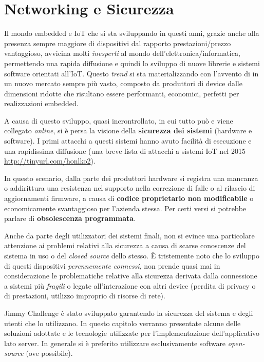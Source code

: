 \section{Networking e Sicurezza}

Il mondo embedded e IoT che si sta sviluppando in questi anni, grazie anche alla presenza sempre maggiore di dispositivi dal rapporto prestazioni/prezzo vantaggioso, avvicina molti \textit{inesperti} al mondo dell'elettronica/informatica, permettendo una rapida diffusione e quindi lo sviluppo di nuove librerie e sistemi software orientati all'IoT. Questo \textit{trend} si sta materializzando con l'avvento di in un nuovo mercato sempre più vasto, composto da produttori di device dalle dimensioni ridotte che risultano essere performanti, economici, perfetti per realizzazioni embedded.

A causa di questo sviluppo, quasi incrontrollato, in cui tutto può e viene  collegato \textit{online}, si è persa la visione della \textbf{sicurezza dei sistemi} (hardware e software). I primi attacchi a questi sistemi hanno avuto facilità di esecuzione e una rapidissima diffusione (una breve lista di attacchi a sistemi IoT nel 2015 \url{http://tinyurl.com/honlko2}).

In questo scenario, dalla parte dei produttori hardware si registra una mancanza o addirittura una resistenza nel supporto nella correzione di falle o al rilascio di aggiornamenti firmware, a causa di \textbf{codice proprietario non modificabile} o economicamente svantaggioso per l'azienda stessa. Per certi versi si potrebbe parlare di \textbf{obsolescenza programmata}.

Anche da parte degli utilizzatori dei sistemi finali, non si evince una particolare attenzione ai problemi relativi alla sicurezza a causa di scarse conoscenze del sistema in uso o del \textit{closed source} dello stesso. È tristemente noto che lo sviluppo di questi dispositivi \textit{perennemente connessi}, non prende quasi mai in considerazione le problematiche relative alla sicurezza derivata dalla connessione a sistemi più \textit{fragili} o legate all'interazione con altri device (perdita di privacy o di prestazioni, utilizzo improprio di risorse di rete).

Jimmy Challenge è stato sviluppato garantendo la sicurezza del sistema e degli utenti che lo utilizzano. In questo capitolo verranno presentate alcune delle soluzioni adottate e le tecnologie utilizzate per l'implementazione dell'applicativo lato server.
In generale si è preferito utilizzare esclusivamente software \textit{open-source} (ove possibile).


